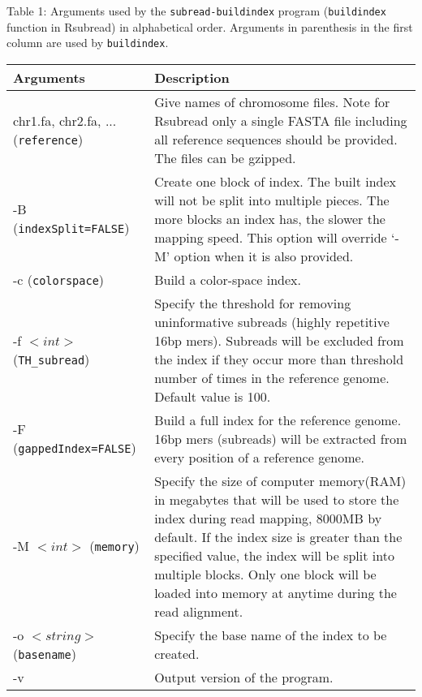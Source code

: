 \documentclass[12pt]{report}
\newcommand{\code}[1]{{\small\texttt{#1}}}
\newcommand{\Rsubread}{\textsf{Rsubread}}
\begin{document}
\begin{table}[!tpb]
\raggedright{Table 1: Arguments used by the \code{subread-buildindex} program (\code{buildindex} function in \Rsubread) in alphabetical order.
Arguments in parenthesis in the first column are used by \code{buildindex}.\newline\\}
\begin{tabular}{|p{4cm}|p{12cm}|}
\hline
Arguments & Description \\
\hline
chr1.fa, chr2.fa, ... \newline (\code{reference}) & Give names of chromosome files. Note for {\Rsubread} only a single FASTA file including all reference sequences should be provided. The files can be gzipped.\\
\hline
-B \newline (\code{indexSplit=FALSE}) & Create one block of index. The built index will not be split into multiple pieces. The more blocks an index has, the slower the mapping speed. This option will override `-M' option when it is also provided.\\
\hline
-c \newline (\code{colorspace}) & Build a color-space index.\\
\hline
-f $<int>$ \newline (\code{TH\_subread}) & Specify the threshold for removing uninformative subreads (highly repetitive 16bp mers). Subreads will be excluded from the index if they occur more than threshold number of times in the reference genome. Default value is 100.\\
\hline
-F \newline (\code{gappedIndex=FALSE}) & Build a full index for the reference genome. 16bp mers (subreads) will be extracted from every position of a reference genome.\\
\hline
-M $<int>$ \newline (\code{memory}) & Specify the size of computer memory(RAM) in megabytes that will be used to store the index during read mapping, 8000MB by default. If the index size  is greater than the specified value, the index will be split into multiple blocks. Only one block will be loaded into memory at anytime during the read alignment.\\
\hline
-o $<string>$ \newline (\code{basename}) & Specify the base name of the index to be created.\\
\hline
-v & Output version of the program. \\
\hline
\end{tabular}
\end{table}
\end{document}
